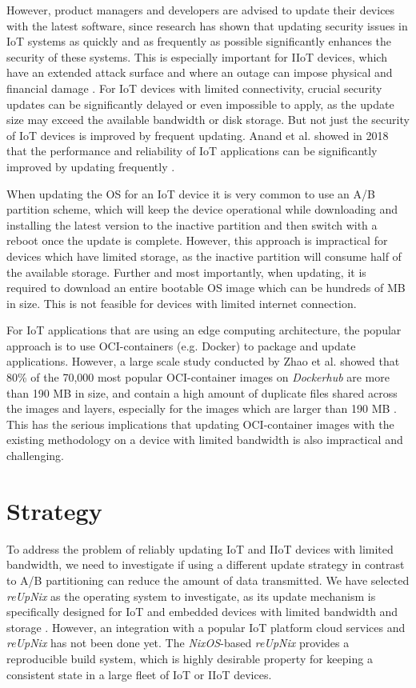 However, product managers and developers are advised to update their devices with
the latest software, since
research has shown that updating security issues in \ac{IoT} systems as quickly
and as frequently as possible significantly enhances the security of these systems.
This is especially important for \ac{IIoT} devices, which have an extended attack
surface and where an outage can impose physical and financial damage \cite{s20247160}.
For \ac{IoT} devices with limited connectivity, crucial security updates can be
significantly delayed or even impossible to apply, as the update size may exceed
the available bandwidth or disk storage. But not just the security of \ac{IoT}
devices is improved by frequent updating. Anand et al. showed in 2018 that the
performance and reliability of \ac{IoT} applications can be significantly improved
by updating frequently \cite{Anand2018}.

When updating the \ac{OS} for an \ac{IoT} device it is very common to use an
A/B partition scheme, which will keep the device operational while downloading
and installing the latest version to the inactive partition and then switch with
a reboot once the update is complete. However, this approach is impractical for
devices which have limited storage, as the inactive partition will consume
half of the available storage. Further and most importantly, when updating,
it is required to download an entire bootable \ac{OS} image which can be
hundreds of \ac{MB} in size. This is not feasible for devices with limited
internet connection.

For \ac{IoT} applications that are using an edge computing architecture, the popular
approach is to use \ac{OCI}-containers (e.g. Docker) to package and update applications.
However, a large scale study conducted by Zhao et al. showed that 80\% of the
70,000 most popular \ac{OCI}-container images on \textit{Dockerhub} are more than
190 \ac{MB} in size, and contain a high amount of duplicate files shared across the images
and layers, especially for the images which are larger than 190 \ac{MB} \cite{9242268}.
This has the serious implications that updating \ac{OCI}-container images with
the existing methodology on a device with limited bandwidth is also impractical
and challenging.
\clearpage

\section{Strategy}
To address the problem of reliably updating \ac{IoT} and \ac{IIoT}
devices with limited bandwidth, we need to investigate if using a different
update strategy in contrast to A/B partitioning can reduce the amount of data transmitted.
We have selected \textit{reUpNix} as the operating system to investigate, as its
update mechanism is specifically designed for \ac{IoT} and embedded devices with
limited bandwidth and storage \cite{gollenstede:23:lctes}. However, an integration
with a popular \ac{IoT} platform cloud services and \textit{reUpNix} has not
been done yet. The \textit{NixOS}-based \textit{reUpNix} provides a reproducible
build system, which is highly desirable property for keeping a consistent state
in a large fleet of \ac{IoT} or \ac{IIoT} devices.

